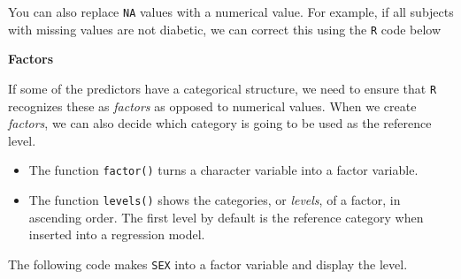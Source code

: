 \documentclass[
]{article}
\newenvironment{Shaded}{\begin{snugshade}}{\end{snugshade}}
\newcommand{\CommentTok}[1]{\textcolor[rgb]{0.56,0.35,0.01}{\textit{#1}}}
\newcommand{\DecValTok}[1]{\textcolor[rgb]{0.00,0.00,0.81}{#1}}
\newcommand{\KeywordTok}[1]{\textcolor[rgb]{0.13,0.29,0.53}{\textbf{#1}}}
\newcommand{\NormalTok}[1]{#1}
\newcommand{\OperatorTok}[1]{\textcolor[rgb]{0.81,0.36,0.00}{\textbf{#1}}}
\newcommand{\StringTok}[1]{\textcolor[rgb]{0.31,0.60,0.02}{#1}}
\begin{document}
\begin{Shaded}
\end{Shaded}

You can also replace \texttt{NA} values with a numerical value. For
example, if all subjects with missing values are not diabetic, we can
correct this using the \texttt{R} code below

\begin{Shaded}
\end{Shaded}

\textbf{Factors}

If some of the predictors have a categorical structure, we need to
ensure that \texttt{R} recognizes these as \emph{factors} as opposed to
numerical values. When we create \emph{factors}, we can also decide
which category is going to be used as the reference level.

\begin{itemize}
\item
  The function \texttt{factor()} turns a character variable into a
  factor variable.
\item
  The function \texttt{levels()} shows the categories, or \emph{levels},
  of a factor, in ascending order. The first level by default is the
  reference category when inserted into a regression model.
\end{itemize}

The following code makes \texttt{SEX} into a factor variable and display
the level.

\begin{Shaded}
\end{Shaded}
\end{document}
